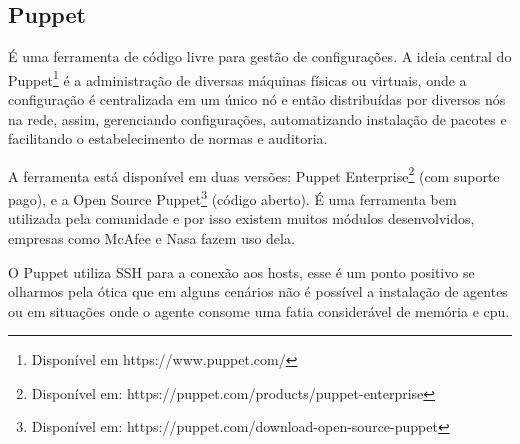 \subsection{Puppet}
É uma ferramenta de código livre para gestão de configurações. A ideia central do Puppet\footnote{Disponível em https://www.puppet.com/} é a administração de diversas máquinas físicas ou virtuais, onde a configuração é centralizada em um único nó e então distribuídas por diversos nós na rede, assim, gerenciando configurações, automatizando instalação de pacotes e facilitando o estabelecimento de normas e auditoria.\cite{walberg2008automate}

A ferramenta está disponível em duas versões: Puppet Enterprise\footnote{Disponível em: https://puppet.com/products/puppet-enterprise} (com suporte pago), e a Open Source Puppet\footnote{Disponível em: https://puppet.com/download-open-source-puppet} (código aberto). É uma ferramenta bem utilizada pela comunidade e por isso existem muitos módulos desenvolvidos, empresas como McAfee e Nasa fazem uso dela.

O Puppet utiliza SSH para a conexão aos hosts, esse é um ponto positivo se olharmos pela ótica que em alguns cenários não é possível a instalação de agentes ou em situações onde o agente consome uma fatia considerável de memória e cpu.

